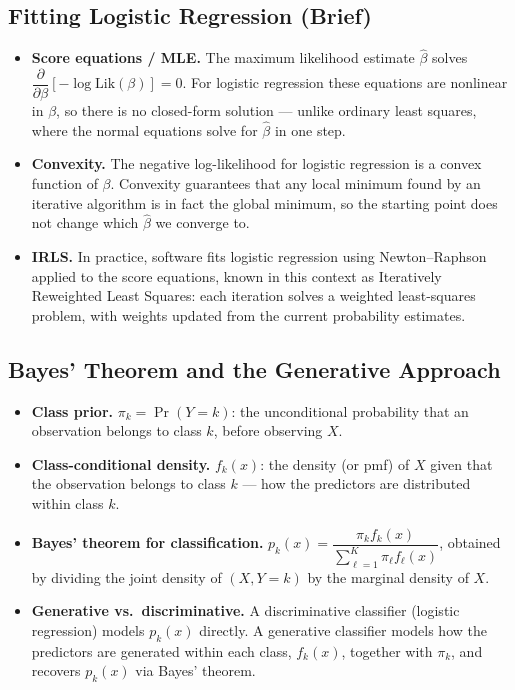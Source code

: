 \documentclass[11pt]{article}
\begin{document}
\subsection{Fitting Logistic Regression (Brief)}
\begin{keydefbox}
\begin{itemize}
\item \textbf{Score equations / MLE.} The maximum likelihood estimate $\hat\beta$ solves $\dfrac{\partial}{\partial\beta}\left[-\log\mathrm{Lik}(\beta)\right]=0$. For logistic regression these equations are nonlinear in $\beta$, so there is no closed-form solution --- unlike ordinary least squares, where the normal equations solve for $\hat\beta$ in one step.
\item \textbf{Convexity.} The negative log-likelihood for logistic regression is a convex function of $\beta$. Convexity guarantees that any local minimum found by an iterative algorithm is in fact the global minimum, so the starting point does not change which $\hat\beta$ we converge to.
\item \textbf{IRLS.} In practice, software fits logistic regression using Newton--Raphson applied to the score equations, known in this context as Iteratively Reweighted Least Squares: each iteration solves a weighted least-squares problem, with weights updated from the current probability estimates.
\end{itemize}
\end{keydefbox}

\subsection{Bayes' Theorem and the Generative Approach}
\begin{keydefbox}
\begin{itemize}
\item \textbf{Class prior.} $\pi_k = \Pr(Y=k)$: the unconditional probability that an observation belongs to class $k$, before observing $X$.
\item \textbf{Class-conditional density.} $f_k(x)$: the density (or pmf) of $X$ given that the observation belongs to class $k$ --- how the predictors are distributed within class $k$.
\item \textbf{Bayes' theorem for classification.} $p_k(x) = \dfrac{\pi_k f_k(x)}{\sum_{\ell=1}^K \pi_\ell f_\ell(x)}$, obtained by dividing the joint density of $(X,Y=k)$ by the marginal density of $X$.
\item \textbf{Generative vs.\ discriminative.} A discriminative classifier (logistic regression) models $p_k(x)$ directly. A generative classifier models how the predictors are generated within each class, $f_k(x)$, together with $\pi_k$, and recovers $p_k(x)$ via Bayes' theorem.
\end{itemize}
\end{keydefbox}
\end{document}
